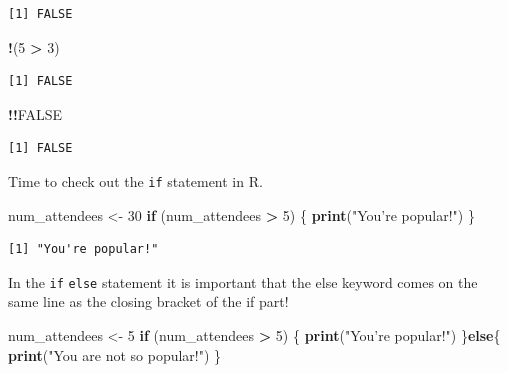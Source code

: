 \documentclass[
]{book}
\newenvironment{Shaded}{\begin{snugshade}}{\end{snugshade}}
\newcommand{\ControlFlowTok}[1]{\textcolor[rgb]{0.13,0.29,0.53}{\textbf{#1}}}
\newcommand{\DecValTok}[1]{\textcolor[rgb]{0.00,0.00,0.81}{#1}}
\newcommand{\KeywordTok}[1]{\textcolor[rgb]{0.13,0.29,0.53}{\textbf{#1}}}
\newcommand{\NormalTok}[1]{#1}
\newcommand{\OperatorTok}[1]{\textcolor[rgb]{0.81,0.36,0.00}{\textbf{#1}}}
\newcommand{\OtherTok}[1]{\textcolor[rgb]{0.56,0.35,0.01}{#1}}
\newcommand{\StringTok}[1]{\textcolor[rgb]{0.31,0.60,0.02}{#1}}
\begin{document}
\begin{verbatim}
[1] FALSE
\end{verbatim}

\begin{Shaded}
\begin{Highlighting}[]
\OperatorTok{!}\NormalTok{(}\DecValTok{5} \OperatorTok{>}\StringTok{ }\DecValTok{3}\NormalTok{)}
\end{Highlighting}
\end{Shaded}

\begin{verbatim}
[1] FALSE
\end{verbatim}

\begin{Shaded}
\begin{Highlighting}[]
\OperatorTok{!!}\OtherTok{FALSE}
\end{Highlighting}
\end{Shaded}

\begin{verbatim}
[1] FALSE
\end{verbatim}

Time to check out the \texttt{if} statement in R.

\begin{Shaded}
\begin{Highlighting}[]
\NormalTok{num_attendees <-}\StringTok{ }\DecValTok{30}
\ControlFlowTok{if}\NormalTok{ (num_attendees }\OperatorTok{>}\StringTok{ }\DecValTok{5}\NormalTok{) \{}
  \KeywordTok{print}\NormalTok{(}\StringTok{"You're popular!"}\NormalTok{)}
\NormalTok{\}}
\end{Highlighting}
\end{Shaded}

\begin{verbatim}
[1] "You're popular!"
\end{verbatim}

In the \texttt{if} \texttt{else} statement it is important that the else keyword comes on the same line as the closing bracket of the if part!

\begin{Shaded}
\begin{Highlighting}[]
\NormalTok{num_attendees <-}\StringTok{ }\DecValTok{5}
\ControlFlowTok{if}\NormalTok{ (num_attendees }\OperatorTok{>}\StringTok{ }\DecValTok{5}\NormalTok{) \{}
  \KeywordTok{print}\NormalTok{(}\StringTok{"You're popular!"}\NormalTok{)}
\NormalTok{\}}\ControlFlowTok{else}\NormalTok{\{}
  \KeywordTok{print}\NormalTok{(}\StringTok{"You are not so popular!"}\NormalTok{)}
\NormalTok{\}}
\end{Highlighting}
\end{Shaded}
\end{document}
